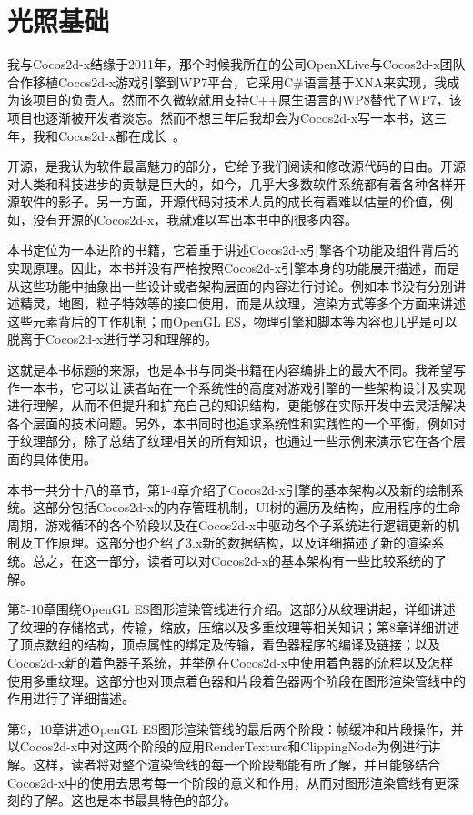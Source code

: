 \chapter{光照基础}
\minitoc


我与Cocos2d-x结缘于2011年，那个时候我所在的公司OpenXLive与Cocos2d-x团队合作移植Cocos2d-x游戏引擎到WP7平台，它采用C\#语言基于XNA来实现，我成为该项目的负责人。然而不久微软就用支持C++原生语言的WP8替代了WP7，该项目也逐渐被开发者淡忘。然而不想三年后我却会为Cocos2d-x写一本书，这三年，我和Cocos2d-x都在成长~\cite{test}。


开源，是我认为软件最富魅力的部分，它给予我们阅读和修改源代码的自由。开源对人类和科技进步的贡献是巨大的，如今，几乎大多数软件系统都有着各种各样开源软件的影子。另一方面，开源代码对技术人员的成长有着难以估量的价值，例如，没有开源的Cocos2d-x，我就难以写出本书中的很多内容。

本书定位为一本进阶的书籍，它着重于讲述Cocos2d-x引擎各个功能及组件背后的实现原理。因此，本书并没有严格按照Cocos2d-x引擎本身的功能展开描述，而是从这些功能中抽象出一些设计或者架构层面的内容进行讨论。例如本书没有分别讲述精灵，地图，粒子特效等的接口使用，而是从纹理，渲染方式等多个方面来讲述这些元素背后的工作机制；而OpenGL ES，物理引擎和脚本等内容也几乎是可以脱离于Cocos2d-x进行学习和理解的。

这就是本书标题的来源，也是本书与同类书籍在内容编排上的最大不同。我希望写作一本书，它可以让读者站在一个系统性的高度对游戏引擎的一些架构设计及实现进行理解，从而不但提升和扩充自己的知识结构，更能够在实际开发中去灵活解决各个层面的技术问题。另外，本书同时也追求系统性和实践性的一个平衡，例如对于纹理部分，除了总结了纹理相关的所有知识，也通过一些示例来演示它在各个层面的具体使用。

本书一共分十八的章节，第1-4章介绍了Cocos2d-x引擎的基本架构以及新的绘制系统。这部分包括Cocos2d-x的内存管理机制，UI树的遍历及结构，应用程序的生命周期，游戏循环的各个阶段以及在Cocos2d-x中驱动各个子系统进行逻辑更新的机制及工作原理。这部分也介绍了3.x新的数据结构，以及详细描述了新的渲染系统。总之，在这一部分，读者可以对Cocos2d-x的基本架构有一些比较系统的了解。

第5-10章围绕OpenGL ES图形渲染管线进行介绍。这部分从纹理讲起，详细讲述了纹理的存储格式，传输，缩放，压缩以及多重纹理等相关知识；第8章详细讲述了顶点数组的结构，顶点属性的绑定及传输，着色器程序的编译及链接；以及Cocos2d-x新的着色器子系统，并举例在Cocos2d-x中使用着色器的流程以及怎样使用多重纹理。这部分也对顶点着色器和片段着色器两个阶段在图形渲染管线中的作用进行了详细描述。

\begin{fullwidth}
第9，10章讲述OpenGL ES图形渲染管线的最后两个阶段：帧缓冲和片段操作，并以Cocos2d-x中对这两个阶段的应用RenderTexture和ClippingNode为例进行讲解。这样，读者将对整个渲染管线的每一个阶段都能有所了解，并且能够结合Cocos2d-x中的使用去思考每一个阶段的意义和作用，从而对图形渲染管线有更深刻的了解。这也是本书最具特色的部分。
\end{fullwidth}


